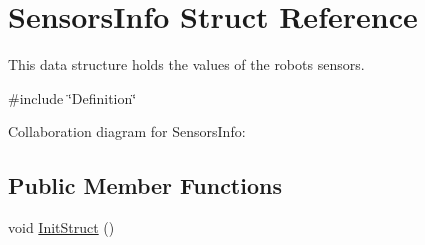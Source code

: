 \hypertarget{struct_sensors_info}{}\section{Sensors\+Info Struct Reference}
\label{struct_sensors_info}


This data structure holds the values of the robot\textquotesingle{}s sensors.  




{\ttfamily \#include \char`\"{}Definition\char`\"{}}



Collaboration diagram for Sensors\+Info\+:
\subsection*{Public Member Functions}
\begin{DoxyCompactItemize}
\item 
void \hyperlink{struct_sensors_info_a321b3a120733f8a2a317422cfe8e4869}{Init\+Struct} ()
\end{DoxyCompactItemize}
